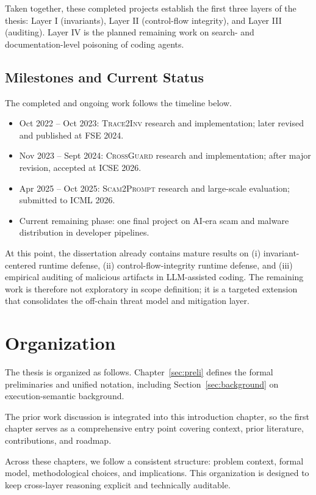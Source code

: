Taken together, these completed projects establish the first three layers of the thesis:
Layer I (invariants), Layer II (control-flow integrity), and Layer III (auditing).
Layer IV is the planned remaining work on search- and documentation-level poisoning of coding agents.

\subsection{Milestones and Current Status}

The completed and ongoing work follows the timeline below.
\begin{itemize}
	\item Oct 2022 -- Oct 2023: \textsc{Trace2Inv} research and implementation;
	later revised and published at FSE 2024.
	\item Nov 2023 -- Sept 2024: \textsc{CrossGuard} research and implementation;
	after major revision, accepted at ICSE 2026.
	\item Apr 2025 -- Oct 2025: \textsc{Scam2Prompt} research and large-scale evaluation;
	submitted to ICML 2026.
	\item Current remaining phase: one final project on AI-era scam and malware distribution in developer pipelines.
\end{itemize}

At this point, the dissertation already contains mature results on
(i) invariant-centered runtime defense,
(ii) control-flow-integrity runtime defense, and
(iii) empirical auditing of malicious artifacts in LLM-assisted coding.
The remaining work is therefore not exploratory in scope definition;
it is a targeted extension that consolidates the off-chain threat model and mitigation layer.






\section{Organization}

The thesis is organized as follows.
Chapter~\ref{sec:preli} defines the formal preliminaries and unified notation, including Section~\ref{sec:background} on execution-semantic background.

The prior work discussion is integrated into this introduction chapter,
so the first chapter serves as a comprehensive entry point covering context,
prior literature, contributions, and roadmap.

Across these chapters, we follow a consistent structure: problem context,
formal model, methodological choices, and implications.
This organization is designed to keep cross-layer reasoning explicit and technically auditable.
